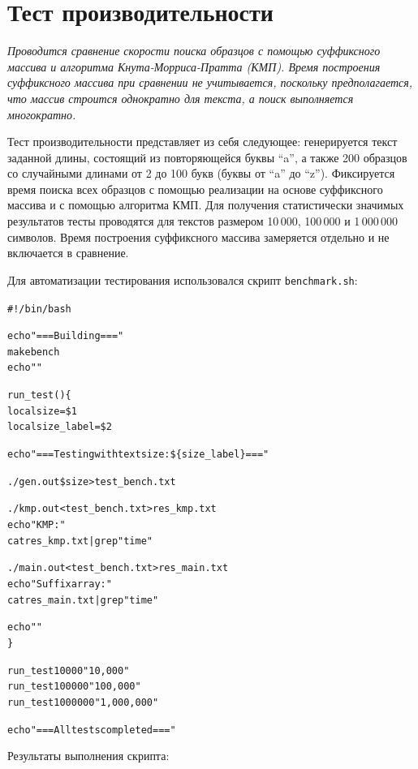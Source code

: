 \section{Тест производительности}
{\itshape Проводится сравнение скорости поиска образцов с помощью суффиксного массива и алгоритма Кнута-Морриса-Пратта (КМП). Время построения суффиксного массива при сравнении не учитывается, поскольку предполагается, что массив строится однократно для текста, а поиск выполняется многократно.}

Тест производительности представляет из себя следующее: генерируется текст заданной длины, состоящий из повторяющейся буквы \enquote{a}, а также 200 образцов со случайными длинами от 2 до 100 букв (буквы от \enquote{a} до \enquote{z}). Фиксируется время поиска всех образцов с помощью реализации на основе суффиксного массива и с помощью алгоритма КМП. Для получения статистически значимых результатов тесты проводятся для текстов размером 10\,000, 100\,000 и 1\,000\,000 символов. Время построения суффиксного массива замеряется отдельно и не включается в сравнение.

Для автоматизации тестирования использовался скрипт \texttt{benchmark.sh}:

\begin{alltt}
#!/bin/bash

echo "=== Building ==="
make bench
echo ""

run_test() \{
    local size=\$1
    local size_label=\$2

    echo "=== Testing with text size: \$\{size_label\} ==="

    ./gen.out \$size > test_bench.txt

    ./kmp.out < test_bench.txt > res_kmp.txt
    echo "KMP:"
    cat res_kmp.txt | grep "time"

    ./main.out < test_bench.txt > res_main.txt
    echo "Suffix array:"
    cat res_main.txt | grep "time"

    echo ""
\}

run_test 10000 "10,000"
run_test 100000 "100,000"
run_test 1000000 "1,000,000"

echo "=== All tests completed ==="
\end{alltt}

\noindent Результаты выполнения скрипта:

